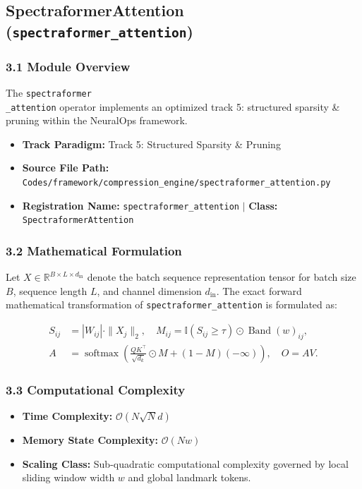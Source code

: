 \subsection{SpectraformerAttention (\texttt{spectraformer\_attention})}
\label{sec:app_module_spectraformer_attention}

\subsubsection*{3.1 Module Overview}
The \texttt{spectraformer\\_attention} operator implements an optimized track 5: structured sparsity \& pruning within the NeuralOps framework.
\begin{itemize}
    \item \textbf{Track Paradigm:} Track 5: Structured Sparsity & Pruning
    \item \textbf{Source File Path:} \texttt{Codes/framework/compression\_engine/spectraformer\_attention.py}
    \item \textbf{Registration Name:} \texttt{spectraformer\_attention} $\mid$ \textbf{Class:} \texttt{SpectraformerAttention}
\end{itemize}

\subsubsection*{3.2 Mathematical Formulation}
Let $X \in \mathbb{R}^{B \times L \times d_{\text{in}}}$ denote the batch sequence representation tensor for batch size $B$, sequence length $L$, and channel dimension $d_{\text{in}}$. The exact forward mathematical transformation of \texttt{spectraformer\_attention} is formulated as:

\begin{align}
S_{ij} &= |W_{ij}| \cdot \|X_j\|_2, \quad M_{ij} = \mathbb{I}(S_{ij} \ge \tau) \odot \operatorname{Band}(w)_{ij}, \\
A &= \operatorname{softmax}\left(\frac{Q K^\top}{\sqrt{d_k}} \odot M + (1 - M)(-\infty)\right), \quad O = A V.
\end{align}


\subsubsection*{3.3 Computational Complexity}
\begin{itemize}
    \item \textbf{Time Complexity:} $\mathcal{O}(N \sqrt{N} d)$
    \item \textbf{Memory State Complexity:} $\mathcal{O}(N w)$
    \item \textbf{Scaling Class:} Sub-quadratic computational complexity governed by local sliding window width $w$ and global landmark tokens.
\end{itemize}

